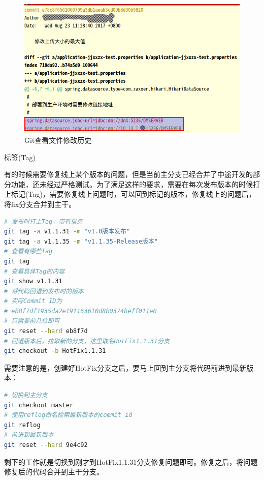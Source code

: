 \documentclass[12pt]{book}
\makeatletter
\numberwithin{dummy}{section}
\theoremstyle{ocrenumbox}
\theoremstyle{blacknumex}
\theoremstyle{blacknumbox}
\theoremstyle{ocrenum}
\renewcommand{\subsection}{\@startsection {subsection}{2}{\z@}
	{-3ex \@plus -0.1ex \@minus -.4ex}
	{0.5ex \@plus.2ex }
	{\normalfont\sffamily\bfseries}}
\makeatother
\begin{document}
\begin{figure}[htbp]
	\centering
	\includegraphics[scale=0.4]{filemodifyhistory.png}
	\caption{Git查看文件修改历史}
	\label{fig:filemodifyhistory}
\end{figure}

\subsection{标签(Tag)}

有的时候需要修复线上某个版本的问题，但是当前主分支已经合并了中途开发的部分功能，还未经过严格测试。为了满足这样的要求，需要在每次发布版本的时候打上标记(Tag)，需要修复线上问题时，可以回到标记的版本，修复线上的问题后，将fix分支合并到主干。

\begin{lstlisting}[language=Bash]
# 发布时打上Tag，带有信息
git tag -a v1.1.31 -m "v1.0版本发布"
git tag -a v1.1.35 -m "v1.1.35-Release版本"
# 查看有哪些Tag
git tag
# 查看具体Tag的内容
git show v1.1.31
# 将代码回退到发布时的版本
# 实际Commit ID为
# eb8f7df1935da2e191163610d8b0374beff011e0
# 只需要前几位即可
git reset --hard eb8f7d
# 回退版本后，拉取新的分支，这里取名HotFix1.1.31分支
git checkout -b HotFix1.1.31
\end{lstlisting}

需要注意的是，创建好HotFix分支之后，要马上回到主分支将代码前进到最新版本：

\begin{lstlisting}[language=Bash]
# 切换到主分支
git checkout master
# 使用reflog命名检索最新版本的commit id
git reflog
# 前进到最新版本
git reset --hard 9e4c92
\end{lstlisting}

剩下的工作就是切换到刚才到HotFix1.1.31分支修复问题即可。修复之后，将问题修复后的代码合并到主干分支。
\end{document}
